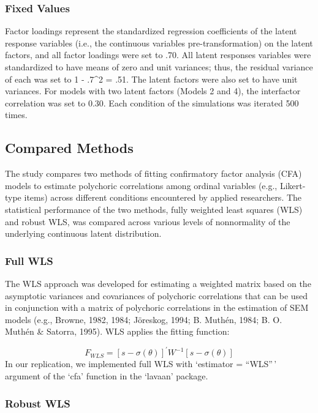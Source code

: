\documentclass[10,a4paperpaper,]{article}
\begin{document}
\subsubsection{Fixed Values}

Factor loadings represent the standardized regression coefficients of
the latent response variables (i.e., the continuous variables
pre-transformation) on the latent factors, and all factor loadings were
set to .70. All latent responses variables were standardized to have
means of zero and unit variances; thus, the residual variance of each
was set to 1 - .7\^{}2 = .51. The latent factors were also set to have
unit variances. For models with two latent factors (Models 2 and 4), the
interfactor correlation was set to 0.30. Each condition of the
simulations was iterated 500 times.

\FloatBarrier

\subsection{Compared Methods}

The study compares two methods of fitting confirmatory factor analysis
(CFA) models to estimate polychoric correlations among ordinal variables
(e.g., Likert-type items) across different conditions encountered by
applied researchers. The statistical performance of the two methods,
fully weighted least squares (WLS) and robust WLS, was compared across
various levels of nonnormality of the underlying continuous latent
distribution.

\subsubsection{Full WLS}

The WLS approach was developed for estimating a weighted matrix based on
the asymptotic variances and covariances of polychoric correlations that
can be used in conjunction with a matrix of polychoric correlations in
the estimation of SEM models (e.g., Browne, 1982, 1984; Jöreskog, 1994;
B. Muthén, 1984; B. O. Muthén \& Satorra, 1995). WLS applies the fitting
function:

\[F_{WLS} = [s- \sigma(\theta)]^{\prime}W^{-1}[s - \sigma(\theta)]\] In
our replication, we implemented full WLS with `estimator = ``WLS''\,'
argument of the `cfa' function in the `lavaan' package.

\subsubsection{Robust WLS}
\end{document}
